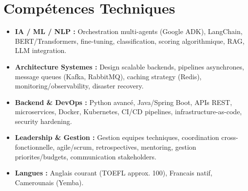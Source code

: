 \documentclass[a4paper,11pt]{article}
\begin{document}
\section{Comp\'etences Techniques}
\begin{itemize}[leftmargin=*, nosep]
    \item \small{\textbf{IA / ML / NLP :} Orchestration multi-agents (Google ADK), LangChain, BERT/Transformers, fine-tuning, classification, scoring algorithmique, RAG, LLM integration.}
    \item \small{\textbf{Architecture Systemes :} Design scalable backends, pipelines asynchrones, message queues (Kafka, RabbitMQ), caching strategy (Redis), monitoring/observability, disaster recovery.}
    \item \small{\textbf{Backend \& DevOps :} Python avancé, Java/Spring Boot, APIs REST, microservices, Docker, Kubernetes, CI/CD pipelines, infrastructure-as-code, security hardening.}
    \item \small{\textbf{Leadership \& Gestion :} Gestion equipes techniques, coordination cross-fonctionnelle, agile/scrum, retrospectives, mentoring, gestion priorites/budgets, communication stakeholders.}
    \item \small{\textbf{Langues :} Anglais courant (TOEFL approx. 100), Francais natif, Camerounais (Yemba).}
\end{itemize}
\end{document}
